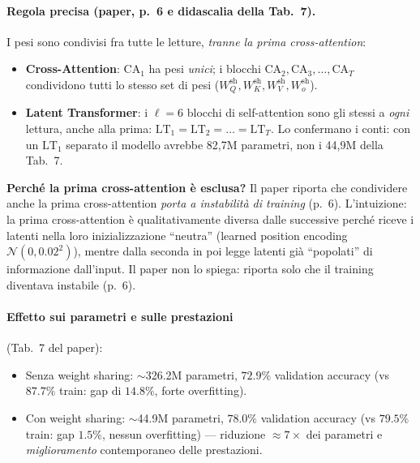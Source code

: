 \documentclass[
  11pt,
]{article}
\begin{document}
\begin{center}
\end{center}

\paragraph{Regola precisa (paper, p.~6 e didascalia della Tab.~7).} I pesi sono condivisi fra tutte le letture, \emph{tranne la prima cross-attention}:
\begin{itemize}
\item \textbf{Cross-Attention}: $\text{CA}_1$ ha pesi \emph{unici}; i blocchi $\text{CA}_2, \text{CA}_3, \ldots, \text{CA}_T$ condividono tutti lo stesso set di pesi ($W_Q^{\text{sh}}, W_K^{\text{sh}}, W_V^{\text{sh}}, W_o^{\text{sh}}$).
\item \textbf{Latent Transformer}: i $\ell = 6$ blocchi di self-attention sono gli stessi a \emph{ogni} lettura, anche alla prima: $\text{LT}_1 = \text{LT}_2 = \ldots = \text{LT}_T$. Lo confermano i conti: con un $\text{LT}_1$ separato il modello avrebbe 82{,}7M parametri, non i 44{,}9M della Tab.~7.
\end{itemize}

\textbf{Perché la prima cross-attention è esclusa?} Il paper riporta che condividere anche la prima cross-attention \emph{porta a instabilità di training} (p.~6). L'intuizione: la prima cross-attention è qualitativamente diversa dalle successive perché riceve i latenti nella loro inizializzazione ``neutra'' (learned position encoding $\mathcal{N}(0, 0.02^2)$), mentre dalla seconda in poi legge latenti già ``popolati'' di informazione dall'input. Il paper non lo spiega: riporta solo che il training diventava instabile (p.~6).

\paragraph{Effetto sui parametri e sulle prestazioni} (Tab.\ 7 del paper):
\begin{itemize}
\item Senza weight sharing: $\sim$326.2M parametri, $72.9\%$ validation accuracy (vs $87.7\%$ train: gap di $14.8\%$, forte overfitting).
\item Con weight sharing: $\sim$44.9M parametri, \textbf{$78.0\%$} validation accuracy (vs $79.5\%$ train: gap $1.5\%$, nessun overfitting) --- riduzione $\approx 7\times$ dei parametri e \emph{miglioramento} contemporaneo delle prestazioni.
\end{itemize}
\end{document}
